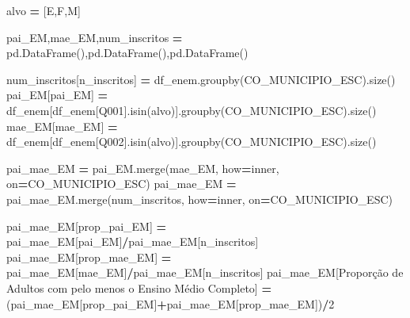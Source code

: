 \documentclass[
  12,
  dvipsnames]{article}
\newenvironment{Shaded}{\begin{snugshade}}{\end{snugshade}}
\newcommand{\DecValTok}[1]{\textcolor[rgb]{0.00,0.00,0.81}{#1}}
\newcommand{\NormalTok}[1]{#1}
\newcommand{\OperatorTok}[1]{\textcolor[rgb]{0.81,0.36,0.00}{\textbf{#1}}}
\newcommand{\StringTok}[1]{\textcolor[rgb]{0.31,0.60,0.02}{#1}}
\begin{document}
\begin{Shaded}
\begin{Highlighting}[]
\NormalTok{alvo }\OperatorTok{=}\NormalTok{ [}\StringTok{\textquotesingle{}E\textquotesingle{}}\NormalTok{,}\StringTok{\textquotesingle{}F\textquotesingle{}}\NormalTok{,}\StringTok{\textquotesingle{}M\textquotesingle{}}\NormalTok{]}

\NormalTok{pai\_EM,mae\_EM,num\_inscritos }\OperatorTok{=}\NormalTok{ pd.DataFrame(),pd.DataFrame(),pd.DataFrame()}

\NormalTok{num\_inscritos[}\StringTok{\textquotesingle{}n\_inscritos\textquotesingle{}}\NormalTok{] }\OperatorTok{=}\NormalTok{ df\_enem.groupby(}\StringTok{\textquotesingle{}CO\_MUNICIPIO\_ESC\textquotesingle{}}\NormalTok{).size()}
\NormalTok{pai\_EM[}\StringTok{\textquotesingle{}pai\_EM\textquotesingle{}}\NormalTok{] }\OperatorTok{=}\NormalTok{ df\_enem[df\_enem[}\StringTok{\textquotesingle{}Q001\textquotesingle{}}\NormalTok{].isin(alvo)].groupby(}\StringTok{\textquotesingle{}CO\_MUNICIPIO\_ESC\textquotesingle{}}\NormalTok{).size()}
\NormalTok{mae\_EM[}\StringTok{\textquotesingle{}mae\_EM\textquotesingle{}}\NormalTok{] }\OperatorTok{=}\NormalTok{ df\_enem[df\_enem[}\StringTok{\textquotesingle{}Q002\textquotesingle{}}\NormalTok{].isin(alvo)].groupby(}\StringTok{\textquotesingle{}CO\_MUNICIPIO\_ESC\textquotesingle{}}\NormalTok{).size()}

\NormalTok{pai\_mae\_EM }\OperatorTok{=}\NormalTok{ pai\_EM.merge(mae\_EM, how}\OperatorTok{=}\StringTok{\textquotesingle{}inner\textquotesingle{}}\NormalTok{, on}\OperatorTok{=}\StringTok{\textquotesingle{}CO\_MUNICIPIO\_ESC\textquotesingle{}}\NormalTok{)}
\NormalTok{pai\_mae\_EM }\OperatorTok{=}\NormalTok{ pai\_mae\_EM.merge(num\_inscritos, how}\OperatorTok{=}\StringTok{\textquotesingle{}inner\textquotesingle{}}\NormalTok{, on}\OperatorTok{=}\StringTok{\textquotesingle{}CO\_MUNICIPIO\_ESC\textquotesingle{}}\NormalTok{)}

\NormalTok{pai\_mae\_EM[}\StringTok{\textquotesingle{}prop\_pai\_EM\textquotesingle{}}\NormalTok{] }\OperatorTok{=}\NormalTok{ pai\_mae\_EM[}\StringTok{\textquotesingle{}pai\_EM\textquotesingle{}}\NormalTok{]}\OperatorTok{/}\NormalTok{pai\_mae\_EM[}\StringTok{\textquotesingle{}n\_inscritos\textquotesingle{}}\NormalTok{]}
\NormalTok{pai\_mae\_EM[}\StringTok{\textquotesingle{}prop\_mae\_EM\textquotesingle{}}\NormalTok{] }\OperatorTok{=}\NormalTok{ pai\_mae\_EM[}\StringTok{\textquotesingle{}mae\_EM\textquotesingle{}}\NormalTok{]}\OperatorTok{/}\NormalTok{pai\_mae\_EM[}\StringTok{\textquotesingle{}n\_inscritos\textquotesingle{}}\NormalTok{]}
\NormalTok{pai\_mae\_EM[}\StringTok{\textquotesingle{}Proporção de Adultos com pelo menos o Ensino Médio Completo\textquotesingle{}}\NormalTok{] }\OperatorTok{=}\NormalTok{ (pai\_mae\_EM[}\StringTok{\textquotesingle{}prop\_pai\_EM\textquotesingle{}}\NormalTok{]}\OperatorTok{+}\NormalTok{pai\_mae\_EM[}\StringTok{\textquotesingle{}prop\_mae\_EM\textquotesingle{}}\NormalTok{])}\OperatorTok{/}\DecValTok{2}


\end{Highlighting}
\end{Shaded}
\end{document}
